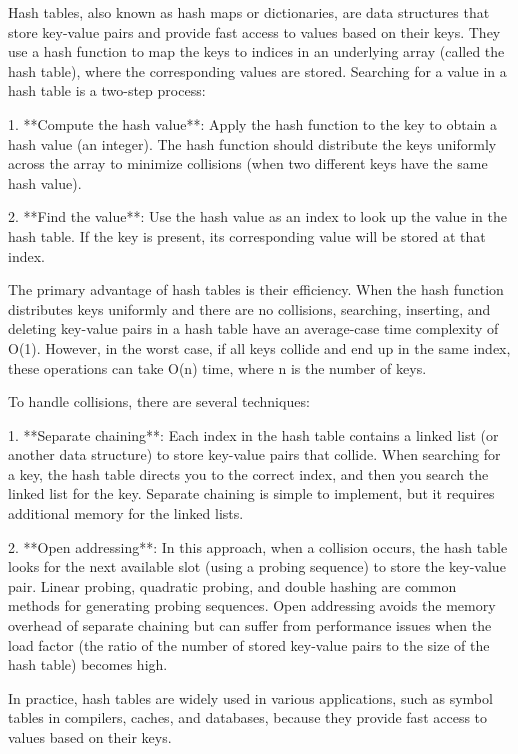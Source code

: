 \documentclass{article}
\begin{document}
Hash tables, also known as hash maps or dictionaries, are data structures that store key-value pairs and provide fast access to values based on their keys. They use a hash function to map the keys to indices in an underlying array (called the hash table), where the corresponding values are stored. Searching for a value in a hash table is a two-step process:

1. **Compute the hash value**: Apply the hash function to the key to obtain a hash value (an integer). The hash function should distribute the keys uniformly across the array to minimize collisions (when two different keys have the same hash value).

2. **Find the value**: Use the hash value as an index to look up the value in the hash table. If the key is present, its corresponding value will be stored at that index.

The primary advantage of hash tables is their efficiency. When the hash function distributes keys uniformly and there are no collisions, searching, inserting, and deleting key-value pairs in a hash table have an average-case time complexity of O(1). However, in the worst case, if all keys collide and end up in the same index, these operations can take O(n) time, where n is the number of keys.

To handle collisions, there are several techniques:

1. **Separate chaining**: Each index in the hash table contains a linked list (or another data structure) to store key-value pairs that collide. When searching for a key, the hash table directs you to the correct index, and then you search the linked list for the key. Separate chaining is simple to implement, but it requires additional memory for the linked lists.

2. **Open addressing**: In this approach, when a collision occurs, the hash table looks for the next available slot (using a probing sequence) to store the key-value pair. Linear probing, quadratic probing, and double hashing are common methods for generating probing sequences. Open addressing avoids the memory overhead of separate chaining but can suffer from performance issues when the load factor (the ratio of the number of stored key-value pairs to the size of the hash table) becomes high.

In practice, hash tables are widely used in various applications, such as symbol tables in compilers, caches, and databases, because they provide fast access to values based on their keys.
\end{document}

